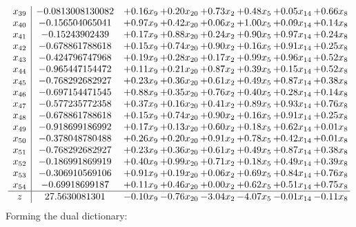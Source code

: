 \documentclass[8pt]{article}
\begin{document}
\[\begin{array}{c| c c@{\hskip 2pt} c@{\hskip 2pt} c@{\hskip 2pt} c@{\hskip 2pt} c@{\hskip 2pt} c@{\hskip 2pt} }
 x_{39}   &  -0.0813008130082 & +  0.16 x_{9} & +  0.20 x_{20} & +  0.73 x_{2} & +  0.48 x_{5} & +  0.05 x_{14} & +  0.66 x_{8}\\
 x_{40}   &  -0.156504065041 & +  0.97 x_{9} & +  0.42 x_{20} & +  0.06 x_{2} & +  1.00 x_{5} & +  0.09 x_{14} & +  0.14 x_{8}\\
 x_{41}   &  -0.15243902439 & +  0.17 x_{9} & +  0.88 x_{20} & +  0.24 x_{2} & +  0.90 x_{5} & +  0.97 x_{14} & +  0.24 x_{8}\\
 x_{42}   &  -0.678861788618 & +  0.15 x_{9} & +  0.74 x_{20} & +  0.90 x_{2} & +  0.16 x_{5} & +  0.91 x_{14} & +  0.25 x_{8}\\
 x_{43}   &  -0.424796747968 & +  0.19 x_{9} & +  0.28 x_{20} & +  0.17 x_{2} & +  0.99 x_{5} & +  0.96 x_{14} & +  0.52 x_{8}\\
 x_{44}   &  -0.965447154472 & +  0.11 x_{9} & +  0.21 x_{20} & +  0.87 x_{2} & +  0.39 x_{5} & +  0.15 x_{14} & +  0.52 x_{8}\\
 x_{45}   &  -0.768292682927 & +  0.23 x_{9} & +  0.36 x_{20} & +  0.61 x_{2} & +  0.49 x_{5} & +  0.87 x_{14} & +  0.38 x_{8}\\
 x_{46}   &  -0.697154471545 & +  0.88 x_{9} & +  0.35 x_{20} & +  0.76 x_{2} & +  0.40 x_{5} & +  0.28 x_{14} & +  0.14 x_{8}\\
 x_{47}   &  -0.577235772358 & +  0.37 x_{9} & +  0.16 x_{20} & +  0.41 x_{2} & +  0.89 x_{5} & +  0.93 x_{14} & +  0.76 x_{8}\\
 x_{48}   &  -0.678861788618 & +  0.15 x_{9} & +  0.74 x_{20} & +  0.90 x_{2} & +  0.16 x_{5} & +  0.91 x_{14} & +  0.25 x_{8}\\
 x_{49}   &  -0.918699186992 & +  0.17 x_{9} & +  0.13 x_{20} & +  0.60 x_{2} & +  0.18 x_{5} & +  0.62 x_{14} & +  0.01 x_{8}\\
 x_{50}   &  -0.378048780488 & +  0.26 x_{9} & +  0.20 x_{20} & +  0.91 x_{2} & +  0.78 x_{5} & +  0.42 x_{14} & +  0.01 x_{8}\\
 x_{51}   &  -0.768292682927 & +  0.23 x_{9} & +  0.36 x_{20} & +  0.61 x_{2} & +  0.49 x_{5} & +  0.87 x_{14} & +  0.38 x_{8}\\
 x_{52}   &  -0.186991869919 & +  0.40 x_{9} & +  0.99 x_{20} & +  0.71 x_{2} & +  0.18 x_{5} & +  0.49 x_{14} & +  0.39 x_{8}\\
 x_{53}   &  -0.306910569106 & +  0.91 x_{9} & +  0.19 x_{20} & +  0.06 x_{2} & +  0.69 x_{5} & +  0.84 x_{14} & +  0.76 x_{8}\\
 x_{54}   &  -0.69918699187 & +  0.11 x_{9} & +  0.46 x_{20} & +  0.00 x_{2} & +  0.62 x_{5} & +  0.51 x_{14} & +  0.75 x_{8}\\
\hline
z    &  27.5630081301 & -0.10 x_{9} & -0.76 x_{20} & -3.04 x_{2} & -4.07 x_{5} & -0.01 x_{14} & -0.11 x_{8}\\
\end{array}\]
Forming the dual dictionary:
\end{document}
